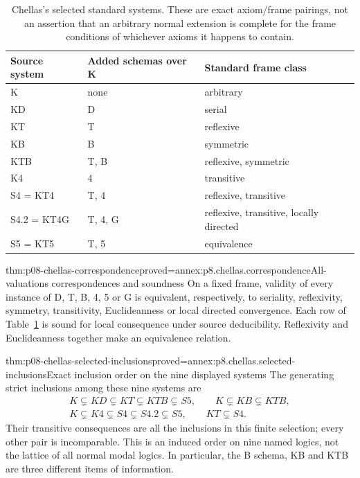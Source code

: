 \begin{table}[!htbp]
\centering\small
\begin{tabular}{@{}lll@{}}
\toprule
Source system & Added schemas over K & Standard frame class \\
\midrule
K & none & arbitrary \\
KD & D & serial \\
KT & T & reflexive \\
KB & B & symmetric \\
KTB & T, B & reflexive, symmetric \\
K4 & 4 & transitive \\
S4 = KT4 & T, 4 & reflexive, transitive \\
S4.2 = KT4G & T, 4, G & reflexive, transitive, locally directed \\
S5 = KT5 & T, 5 & equivalence \\
\bottomrule
\end{tabular}
\caption{Chellas's selected standard systems. These are exact axiom/frame
pairings, not an assertion that an arbitrary normal extension is complete
for the frame conditions of whichever axioms it happens to contain.}
\label{tab:p08-chellas-standard-systems}
\end{table}

\begin{hblemma}{thm:p08-chellas-correspondence}{proved=annex:p8.chellas.correspondence}{All-valuations correspondences and soundness}
On a fixed frame, validity of every instance of D, T, B, 4, 5 or G
is equivalent, respectively, to seriality, reflexivity, symmetry,
transitivity, Euclideanness or local directed convergence. Each row of
Table~\ref{tab:p08-chellas-standard-systems} is sound for local
consequence under source deducibility. Reflexivity and Euclideanness
together make an equivalence relation.
\end{hblemma}

\begin{hbtheorem}{thm:p08-chellas-selected-inclusions}{proved=annex:p8.chellas.selected-inclusions}{Exact inclusion order on the nine displayed systems}
The generating strict inclusions among these nine systems are
\[
\begin{gathered}
 K\subsetneq KD\subsetneq KT\subsetneq KTB\subsetneq S5,\qquad
 K\subsetneq KB\subsetneq KTB,\\
 K\subsetneq K4\subsetneq S4\subsetneq S4.2\subsetneq S5,
 \qquad KT\subsetneq S4.
\end{gathered}
\]
Their transitive consequences are all the inclusions in this finite
selection; every other pair is incomparable. This is an induced order on
nine named logics, not the lattice of all normal modal logics. In
particular, the B schema, KB and KTB are three different items of information.
\end{hbtheorem}

